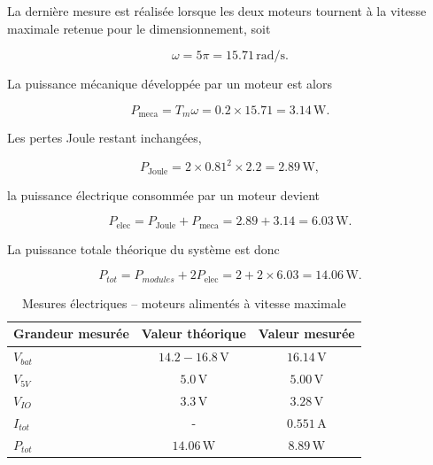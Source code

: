 La dernière mesure est réalisée lorsque les deux moteurs tournent à la vitesse maximale retenue pour le dimensionnement, soit

\begin{equation}
\omega
=
5\pi
=
15.71\,\si{\radian\per\second}.
\end{equation}

La puissance mécanique développée par un moteur est alors

\begin{equation}
P_{\mathrm{meca}}
=
T_m\omega
=
0.2\times15.71
=
3.14\,\si{\watt}.
\end{equation}

Les pertes Joule restant inchangées,

\begin{equation}
P_{\mathrm{Joule}}
=
2\times0.81^2\times2.2
=
2.89\,\si{\watt},
\end{equation}

la puissance électrique consommée par un moteur devient

\begin{equation}
P_{\mathrm{elec}}
=
P_{\mathrm{Joule}}
+
P_{\mathrm{meca}}
=
2.89
+
3.14
=
6.03\,\si{\watt}.
\end{equation}

La puissance totale théorique du système est donc

\begin{equation}
P_{tot}
=
P_{modules}
+
2P_{\mathrm{elec}}
=
2
+
2\times6.03
=
14.06\,\si{\watt}.
\end{equation}

\begin{table}[H]
    \centering
    \begin{tabular}{|l|c|c|}
        \hline
        \textbf{Grandeur mesurée} & \textbf{Valeur théorique} & \textbf{Valeur mesurée} \\
        \hline
        $V_{bat}$ & $14.2-16.8\,\si{\volt}$ & $16.14\,\si{\volt}$ \\
        \hline
        $V_{5V}$ & $5.0\,\si{\volt}$ & $5.00\,\si{\volt}$ \\
        \hline
        $V_{IO}$ & $3.3\,\si{\volt}$ & $3.28\,\si{\volt}$ \\
        \hline
        $I_{tot}$ & - & $0.551\,\si{\ampere}$ \\
        \hline
        $P_{tot}$ & $14.06\,\si{\watt}$ & $8.89\,\si{\watt}$ \\
        \hline
    \end{tabular}
    \caption{Mesures électriques -- moteurs alimentés à vitesse maximale}
    \label{tab:moteurs_allumes_maxspeed}
\end{table}

